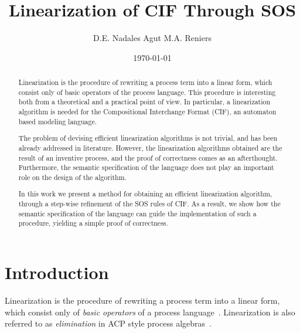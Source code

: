 \documentclass[submission,copyright,creativecommons,sharealike]{eptcs}
\title{Linearization of CIF Through SOS}
\author{
  D.E. Nadales Agut \qquad\qquad M.A. Reniers
  \institute{
    Systems Engineering \\
    Department of Mechanical Engineering \\
    Eindhoven University of Technology (TU/e)
  }
  \email{\{d.e.nadales.agut, m.a.reniers\}@tue.nl}
}
\date{\today}
\begin{document}
\maketitle

\begin{abstract}
Linearization is the procedure of rewriting a process term into a
  linear form, which consist only of basic operators of the process
  language.
This procedure is interesting both from a theoretical and a
  practical point of view.
In particular, a linearization algorithm is needed for the
  Compositional Interchange Format (CIF), an automaton based
  modeling language.

  The problem of devising efficient linearization algorithms is not
  trivial, and has been already addressed in literature.
However, the linearization algorithms obtained are the result of an
  inventive process, and the proof of correctness comes as an
  afterthought. Furthermore, the semantic specification of the
  language does not play an important role on the design of the
  algorithm.

  In this work we present a method for obtaining an efficient
  linearization algorithm, through a step-wise refinement of the SOS
  rules of CIF. As a result, we show how the semantic specification of
  the language can guide the implementation of such a procedure,
  yielding a simple proof of correctness.



















\end{abstract}



\section{Introduction}
\label{sec:introduction}

Linearization is the procedure of rewriting a process term into a
linear form, which consist only of \emph{basic operators} of a process
language~\cite{Khadim3:LinHChiPCTech07,BrandReniCuij:LinHybProcJLAP06,Usenko:LinearizationMuCRLPhD02}. Linearization is also referred to as \emph{elimination} in
ACP style process algebras~\cite{BaetenBastenReniers:ProcessAlgebra10}.
\end{document}
